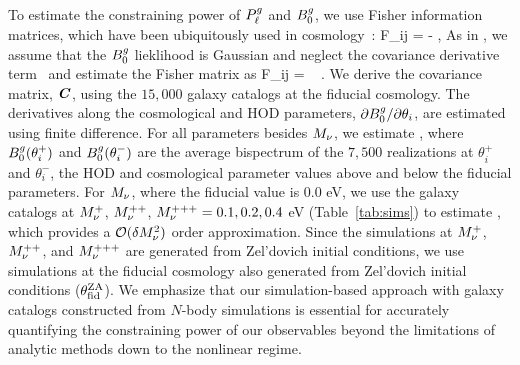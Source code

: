 To estimate the constraining power of $P^g_{\ell}$ and $B^g_0$, we use Fisher information
matrices, which have been ubiquitously used in
cosmology~\citep[\emph{e.g.}][]{jungman1996,tegmark1997,dodelson2003,heavens2009,verde2010}: 
\beq 
F_{ij} = - \bigg \langle {} \bigg \rangle,
\eeq
As in \cite{hahn2020}, we assume that the $B^g_0$ lieklihood is Gaussian and
neglect the covariance derivative term~\citep{carron2013} and estimate the
Fisher matrix as 
\beq \label{eq:fisher}
F_{ij} = ~ .
\eeq
We derive the covariance matrix, $\textbf{\textit{C}}$, using the $15,000$ galaxy catalogs
at the fiducial cosmology. The derivatives along the cosmological and HOD
parameters, $\partial B^g_0/\partial \theta_i$, are estimated using finite
difference. For all parameters besides $M_\nu$, we estimate 
\beq 
{} \approx {}, 
\eeq
where $B^g_0(\theta_i^{+})$ and $B^g_0(\theta_i^{-})$ are the average bispectrum of the 
$7,500$ realizations at $\theta_i^{+}$ and $\theta_i^{-}$, the HOD and  
cosmological parameter values above and below the fiducial parameters.  
For $M_\nu$, where the fiducial value is 0.0 eV, we use the galaxy catalogs 
at $M_\nu^+$, $M_\nu^{++}$, $M_\nu^{+++}=0.1, 0.2, 0.4$ eV (Table~\ref{tab:sims}) 
to estimate 
\beq \label{eq:dbkdmnu} 
\frac{\partial \Bg}{\partial \smnu} \approx {}, 
\eeq
which provides a $\mathcal{O}(\delta M_\nu^2)$ order approximation. 
Since the simulations at $M_\nu^+$, $M_\nu^{++}$, and $M_\nu^{+++}$ are generated 
from Zel'dovich initial conditions, we use simulations at the fiducial cosmology 
also generated from Zel'dovich initial conditions ($\theta_{\rm fid}^{\rm ZA}$). 
We emphasize that our simulation-based approach with galaxy catalogs constructed from
$N$-body simulations is essential for accurately quantifying the constraining power
of our observables beyond the limitations of analytic methods down to the nonlinear regime.
